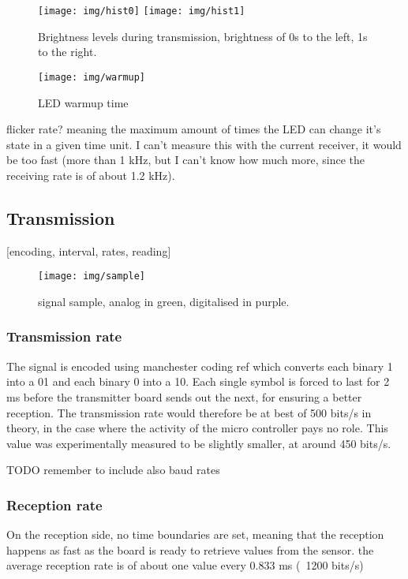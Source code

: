 \begin{figure}
\centering
\texttt{[image: img/hist0]}
\texttt{[image: img/hist1]}
\label{fig:histopeaks}
\caption{Brightness levels during transmission, brightness of 0s to the left, 1s to the right. }
\end{figure}

\begin{figure}
\centering
\texttt{[image: img/warmup]}
\label{fig:warmup}
\caption{LED warmup time}
\end{figure}

flicker rate? meaning the maximum amount of times the LED can change it's state in a given time unit. I can't measure this with the current receiver, it would be too fast (more than 1 kHz, but I can't know how much more, since the receiving rate is of about 1.2 kHz). \\

\subsection{Transmission}
[encoding, interval, rates, reading]

\begin{figure}
\centering
\texttt{[image: img/sample]}
\label{fig:sample}
\caption{signal sample, analog in green, digitalised in purple.}
\end{figure}

\subsubsection{Transmission rate}
The signal is encoded using manchester coding {ref} which converts each binary 1 into a 01 and each binary 0 into a 10.
Each single symbol is forced to last for 2 ms before the transmitter board sends out the next, for ensuring a better reception.
The transmission rate would therefore be at best of 500 bits/s in theory, in the case where the activity of the micro controller pays no role.
This value was experimentally measured to be slightly smaller, at around 450 bits/s. 

TODO remember to include also baud rates

\subsubsection{Reception rate}
On the reception side, no time boundaries are set, meaning that the reception happens as fast as the board is ready to retrieve values from the sensor.
 the average reception rate is of about one value every 0.833 ms  (~1200 bits/s)
 
